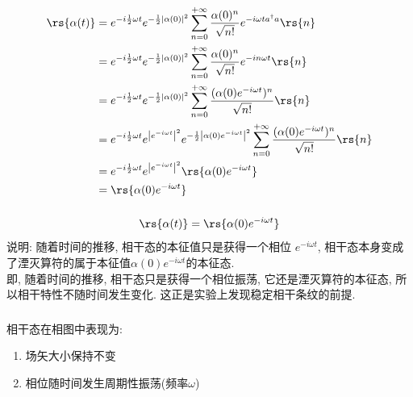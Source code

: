\begin{frame}
    \frametitle{}
    \[ \begin{aligned}
        \rs{\alpha (t)} &= e^{-i\frac{1}{2} \omega t}  e^{-\frac{1}{2}\left|\alpha(0)\right|^2} \sum_{n=0} ^{+\infty}  \frac{\alpha(0)^n}{\sqrt{n!}} e^{-i \omega t  a^\dagger a}  \rs{n}  \\
        &= e^{-i\frac{1}{2} \omega t}  e^{-\frac{1}{2}\left|\alpha(0)\right|^2}\sum_{n=0} ^{+\infty}  \frac{\alpha(0)^n}{\sqrt{n!}} e^{-i n \omega t }  \rs{n}  \\ 
        &= e^{-i\frac{1}{2} \omega t}  e^{-\frac{1}{2}\left|\alpha(0)\right|^2} \sum_{n=0} ^{+\infty}  \frac{(\alpha(0) e^{-i \omega t })^n}{\sqrt{n!}} \rs{n}  \\ 
        &= e^{-i\frac{1}{2} \omega t} e^{\left|e^{-i \omega t }\right|^2}   e^{-\frac{1}{2}\left|\alpha(0)e^{-i \omega t }\right|^2} \sum_{n=0} ^{+\infty}  \frac{(\alpha(0) e^{-i \omega t })^n}{\sqrt{n!}} \rs{n}  \\ 
        &= e^{-i\frac{1}{2} \omega t}  e^{\left|e^{-i \omega t }\right|^2}  \rs{\alpha(0) e^{-i \omega t} } \\ 
        &= \rs{\alpha(0) e^{-i \omega t}} \\ 
       \end{aligned}\]
\end{frame}

\begin{frame}
      \frametitle{}
      \[ \rs{\alpha (t)}= \rs{\alpha(0) e^{-i \omega t}}  \]
       说明: 随着时间的推移, 相干态的本征值只是获得一个相位 $e^{-i \omega t}$, 相干态本身变成了湮灭算符的属于本征值$ \alpha(0) e^{-i \omega t} $的本征态. \\ {\vspace*{0.6em}} 
       即, 随着时间的推移, 相干态只是获得一个相位振荡, 它还是湮灭算符的本征态, 所以相干特性不随时间发生变化. 这正是实验上发现稳定相干条纹的前提.
\end{frame}

\begin{frame}
 \frametitle{}
    \begin{center}
    \end{center}
    相干态在相图中表现为:
 \begin{enumerate}
     \item 场矢大小保持不变
     \item 相位随时间发生周期性振荡(频率$\omega$)
 \end{enumerate}
\end{frame}

